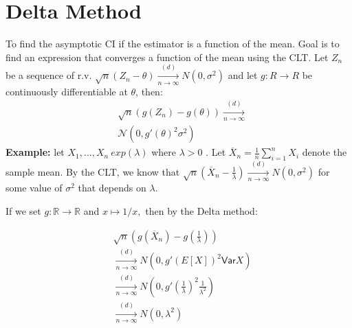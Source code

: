 \section{Delta Method}

To find the asymptotic CI if the estimator is a function of the mean. Goal is to find an expression that converges a function of the mean using the CLT. Let $Z_n$ be a sequence of r.v. $\sqrt{n} (Z_n-\theta) \xrightarrow[n \rightarrow \infty]{(d)} N(0,\sigma^2)$ and let $g: R\longrightarrow R$ be continuously differentiable at $\theta$, then:
\begin{align*}
&\sqrt{n}(g(Z_n) - g(\theta)) \xrightarrow [n \to \infty ]{(d)}\\
&\mathcal{N}(0, g'(\theta )^2 \sigma ^2)
\end{align*}
\textbf{Example:} let  $X_1,... ,X_n ~ exp(\lambda)$  where  $\lambda>0$ . Let  $\overline{X}_ n= \frac{1}{n} \sum _{i = 1}^ n X_ i$ denote the sample mean. By the CLT, we know that $\sqrt{n}\left(\overline{X}_ n - \frac{1}{\lambda }\right) \xrightarrow [n \to \infty ]{(d)} N(0, \sigma ^2)$ for some value of  $\sigma^2$  that depends on  $\lambda$.

If we set $g: \displaystyle \mathbb {R} \to \mathbb {R}$ and $\displaystyle x \mapsto 1/x,$ then by the Delta method:

\begin{align*}
&\sqrt{n}\left( g(\overline{X}_ n) - g\left(\frac{1}{\lambda }\right) \right)\\
&\xrightarrow [n \to \infty ]{(d)} N(0, g'(E[X])^2\textsf{Var}{X})\\
&\xrightarrow [n \to \infty ]{(d)} N(0, g'\left(\frac{1}{\lambda }\right)^2\frac{1}{\lambda ^2})\\
&\xrightarrow [n \to \infty ]{(d)} N(0, \lambda^2)
\end{align*}